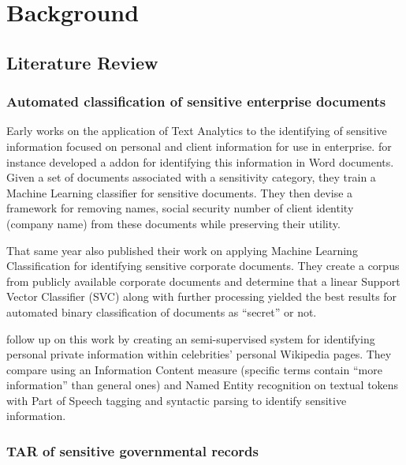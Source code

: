 \documentclass[\version]{l4proj}
\begin{document}
\chapter{Background}

\section{Literature Review}\label{section:lit_review}

\subsection{Automated classification of sensitive enterprise documents}

Early works on the application of Text Analytics to the identifying of sensitive information focused on personal and client information for use in enterprise.
\textcite{cumbyMachineLearningBased2011} for instance developed a addon for identifying this information in Word documents.
Given a set of documents associated with a sensitivity category, they train a Machine Learning classifier for sensitive documents.
They then devise a framework for removing names, social security number of client identity (company name) from these documents while preserving their utility.

That same year \textcite{hartTextClassificationData2011} also published their work on applying Machine Learning Classification for identifying sensitive corporate documents.
They create a corpus from publicly available corporate documents and determine that a linear Support Vector Classifier (SVC) along with further processing yielded the best results for automated binary classification of documents as ``secret'' or not.

\textcite{sanchezDetectingSensitiveInformation2012} follow up on this work by creating an semi-supervised system for identifying personal private information within celebrities' personal Wikipedia pages.
They compare using an Information Content measure (specific terms contain ``more information'' than general ones) and Named Entity recognition on textual tokens with Part of Speech tagging and syntactic parsing to identify sensitive information.

\subsection{TAR of sensitive governmental records}
\end{document}
